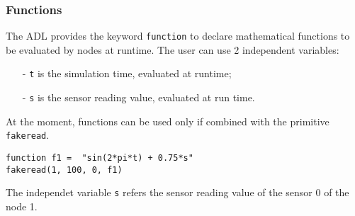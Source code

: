 \subsubsection{Functions}
The ADL provides the keyword \texttt{function} to declare mathematical functions to be evaluated by nodes at runtime. The user can use 2 independent variables:
%
\begin{itemize}
\item[-] \texttt{t} is the simulation time, evaluated at runtime;
\item[-] \texttt{s} is the sensor reading value, evaluated at run time. 
\end{itemize}
%
At the moment, functions can be used only if combined with the primitive \texttt{fakeread}.
%
\begin{lstlisting}[language={adl}]
function f1 =  "sin(2*pi*t) + 0.75*s"
fakeread(1, 100, 0, f1)
\end{lstlisting}
%
The independet variable \texttt{s} refers the sensor reading value of the sensor 0 of the node 1.



